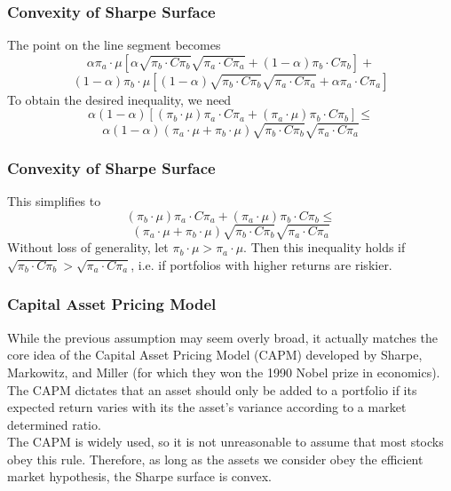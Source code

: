 \documentclass{beamer}
\begin{document}
\begin{frame}
\frametitle{Convexity of Sharpe Surface}
The point on the line segment becomes
\[\alpha\pi_a \cdot \mu [\alpha \sqrt{\pi_b \cdot C \pi_b} \sqrt{\pi_a \cdot C \pi_a} + (1-\alpha) \pi_b \cdot C\pi_b ]+\]
\[(1-\alpha)\pi_b \cdot \mu [(1-\alpha) \sqrt{\pi_b \cdot C \pi_b} \sqrt{\pi_a \cdot C \pi_a} + \alpha \pi_a \cdot C\pi_a ]\]
To obtain the desired inequality, we need 
\[\alpha(1-\alpha)[(\pi_b \cdot \mu )\pi_a \cdot C\pi_a + ( \pi_a \cdot \mu )\pi_b \cdot C\pi_b ] \leq\]
\[\alpha(1-\alpha)(\pi_a \cdot \mu + \pi_b \cdot \mu)\sqrt{\pi_b \cdot C \pi_b} \sqrt{\pi_a \cdot C \pi_a} \]
\end{frame}


\begin{frame}
\frametitle{Convexity of Sharpe Surface}
This simplifies to
\[(\pi_b \cdot \mu )\pi_a \cdot C\pi_a + ( \pi_a \cdot \mu )\pi_b \cdot C\pi_b  \leq \]
\[(\pi_a \cdot \mu + \pi_b \cdot \mu)\sqrt{\pi_b \cdot C \pi_b} \sqrt{\pi_a \cdot C \pi_a} \]
Without loss of generality, let $\pi_b \cdot \mu > \pi_a \cdot \mu$.  Then this inequality holds if $\sqrt{\pi_b \cdot C \pi_b} > \sqrt{\pi_a \cdot C \pi_a}$, i.e. if portfolios with higher returns are riskier. 

\end{frame}

\begin{frame}
\frametitle{Capital Asset Pricing Model}
While the previous assumption may seem overly broad, it actually matches the core idea of the Capital Asset Pricing Model (CAPM) developed by Sharpe, Markowitz, and Miller (for which they won the 1990 Nobel prize in economics).  The CAPM dictates that an asset should only be added to a portfolio if its expected return varies with its the asset's variance according to a market determined ratio.
\vspace{.1in}
\\The CAPM is widely used, so it is not unreasonable to assume that most stocks obey this rule.  Therefore, as long as the assets we consider obey the efficient market hypothesis, the Sharpe surface is convex.
\end{frame}
\end{document}

